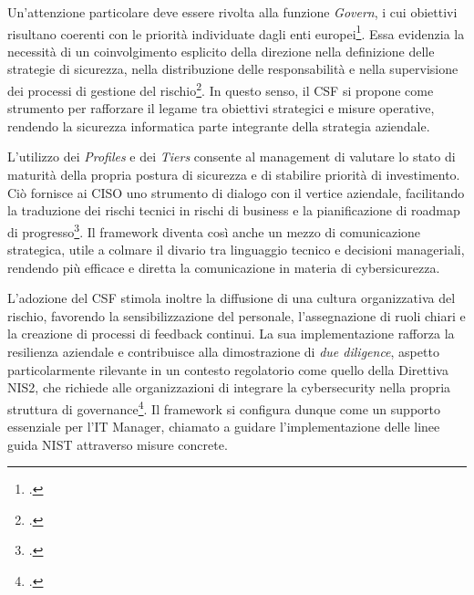 Un'attenzione particolare deve essere rivolta alla funzione \textit{Govern}, i cui obiettivi risultano 
coerenti con le priorità individuate dagli enti europei\footcite[Allegato B]{enisa-threat-landscape}.
Essa evidenzia la necessità di un coinvolgimento esplicito della 
direzione nella definizione delle strategie di sicurezza, nella distribuzione 
delle responsabilità e nella supervisione dei processi di gestione del rischio\footcite[Appendice A]{nist-csf}. 
In questo senso, il CSF si propone come strumento per rafforzare il legame tra obiettivi 
strategici e misure operative, rendendo la sicurezza informatica parte integrante della strategia aziendale.

L’utilizzo dei \textit{Profiles} e dei \textit{Tiers} consente al management 
di valutare lo stato di maturità della propria postura di sicurezza e di stabilire priorità di 
investimento. Ciò fornisce ai CISO uno strumento di dialogo con il vertice 
aziendale, facilitando la traduzione dei rischi tecnici in rischi di business e la pianificazione di 
roadmap di progresso\footcite{parmar-miles-csf}. Il framework diventa così anche un 
mezzo di comunicazione strategica, utile a colmare il divario tra linguaggio tecnico e 
decisioni manageriali, rendendo più efficace e diretta la comunicazione in materia di cybersicurezza.

L’adozione del CSF stimola inoltre la diffusione di una cultura organizzativa del rischio, 
favorendo la sensibilizzazione del personale, l’assegnazione di ruoli chiari e la creazione di 
processi di feedback continui. La sua implementazione rafforza la resilienza aziendale e contribuisce alla dimostrazione di 
\textit{due diligence}, aspetto particolarmente rilevante in un contesto regolatorio come quello 
della Direttiva NIS2, che richiede alle organizzazioni di integrare la cybersecurity nella propria 
struttura di governance\footcite[pp. 110--115]{enisa-threat-landscape}. 
Il framework si configura dunque come un supporto essenziale per l’IT Manager, chiamato a guidare 
l'implementazione delle linee guida NIST attraverso misure concrete.
